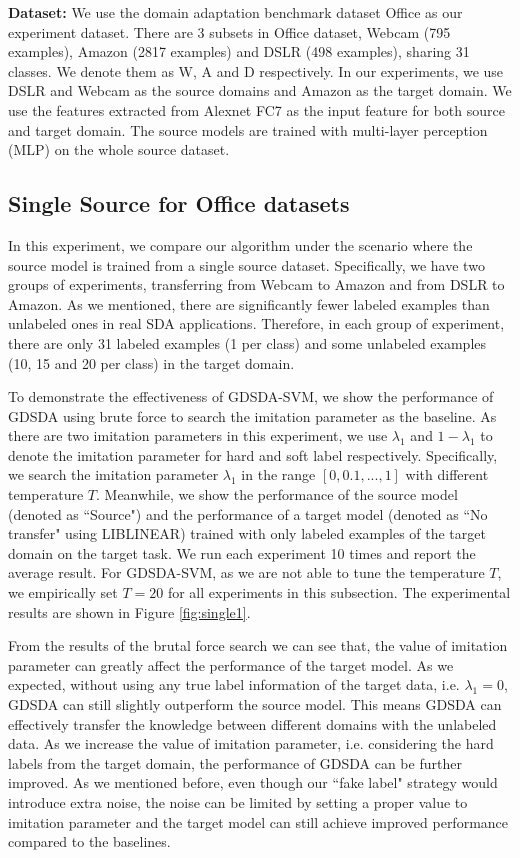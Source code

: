 \textbf{Dataset:}
We use the domain adaptation benchmark dataset Office as our experiment dataset. 
There are 3 subsets in Office dataset, Webcam (795 examples), Amazon (2817 examples) and DSLR (498 examples), sharing 31 classes. We denote them as W, A and D respectively. In our experiments, we use DSLR and Webcam as the source domains and Amazon as the target domain.
We use the features extracted from Alexnet \cite{krizhevsky2012imagenet} FC7 as the input feature for both source and target domain. The source models are trained with multi-layer perception (MLP) on the whole source dataset. 

\subsection{Single Source for Office datasets}
In this experiment, we compare our algorithm under the scenario where the source model is trained from a single source dataset. Specifically, we have two groups of experiments, transferring from Webcam to Amazon and from DSLR to Amazon. As we mentioned, there are significantly fewer labeled examples than unlabeled ones in real SDA applications.
Therefore, in each group of experiment, there are only 31 labeled examples (1 per class) and some unlabeled examples (10, 15 and 20 per class) in the target domain.

To demonstrate the effectiveness of GDSDA-SVM, we show the performance of GDSDA using brute force to search the imitation parameter as the baseline. As there are two imitation parameters in this experiment, we use $\lambda_1$ and  $1-\lambda_1$ to denote the imitation parameter for hard and soft label respectively. Specifically, we search the imitation parameter $\lambda_1$ in the range $[0,0.1,...,1]$ with different temperature $T$. Meanwhile, we show the performance of the source model (denoted as ``Source") and the performance of a target model (denoted as ``No transfer" using LIBLINEAR\cite{fan2008liblinear}) trained with only labeled examples of the target domain on the target task. We run each experiment 10 times and report the average result. For GDSDA-SVM, as we are not able to tune the temperature $T$, we empirically set $T=20$ for all experiments in this subsection. The experimental results are shown in Figure \ref{fig:single1}. 

From the results of the brutal force search we can see that, the value of imitation parameter can greatly affect the performance of the target model.
As we expected, without using any true label information of the target data, i.e. $\lambda_1 = 0$, GDSDA can still slightly outperform the source model. This means GDSDA can effectively transfer the knowledge between different domains with the unlabeled data. As we increase the value of imitation parameter, i.e. considering the hard labels from the target domain, the performance of GDSDA can be further improved. As we mentioned before, even though our ``fake label" strategy would introduce extra noise, the noise can be limited by setting a proper value to imitation parameter and the target model can still achieve improved performance compared to the baselines.

